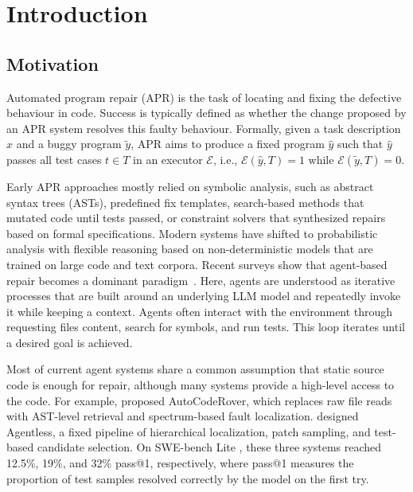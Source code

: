 
\chapter{Introduction}

\section{Motivation}
Automated program repair (APR) is the task of locating and fixing the defective behaviour in code.
Success is typically defined as whether the change proposed by an APR system resolves this faulty behaviour. 
Formally, given a task description $x$ and a buggy program $\tilde{y}$, APR aims to produce a fixed program $\hat{y}$
such that $\hat{y}$ passes all test cases $t \in T$ in an executor $\mathcal{E}$, i.e., $\mathcal{E}(\hat{y}, T) = 1$ while $\mathcal{E}(\tilde{y}, T) = 0$.

Early APR approaches mostly relied on symbolic analysis, such as abstract syntax trees (ASTs), predefined fix templates, 
search-based methods that mutated code until tests passed, or constraint solvers that synthesized repairs based on formal specifications.
Modern systems have shifted to probabilistic analysis with flexible reasoning based on non-deterministic models that are trained on large code and text corpora.
Recent surveys show that agent-based repair becomes a dominant paradigm~\citep{zhang2024slrapr, liu2024agentsse}.
Here, agents are understood as iterative processes that are built around an underlying LLM model and repeatedly invoke it while keeping a context.
Agents often interact with the environment through requesting files content, search for symbols, and run tests.
This loop iterates until a desired goal is achieved.

Most of current agent systems share a common assumption that static source code is enough for repair,
although many systems provide a high-level access to the code.
For example, \citet{zhang2024autocoderover} proposed AutoCodeRover, which replaces raw file reads with AST-level retrieval and
spectrum-based fault localization. \citet{xia2024agentless} designed
Agentless, a fixed pipeline of hierarchical localization, patch sampling, and test-based candidate selection.
On SWE-bench Lite \citep{jimenez2023swebench}, these three systems reached 12.5\%, 19\%, and 32\% pass@1, respectively,
where pass@1 measures the proportion of test samples resolved correctly by the model on the first try.

